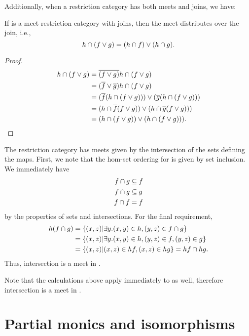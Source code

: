 Additionally, when a restriction category has both meets and joins, we have:
\begin{lemma}\label{lem:meet_distributes_over_join}
  If \R is a meet restriction category with joins, then the meet distributes over the join, i.e.,
  \[
    h\cap(f\vee g) = (h\cap f)\vee (h\cap g).
  \]
\end{lemma}
\begin{proof}
  \begin{align*}
    h\cap(f\vee g) &= \overline{(f\vee g)} h\cap (f\vee g)\\
    &= (\overline{f}\vee \overline{g}) h\cap (f\vee g)\\
    &= (\overline{f}(h\cap (f\vee g))) \vee (\overline{g}(h\cap (f\vee g)))\\
    &= (h\cap \overline{f}(f\vee g)) \vee (h\cap \overline{g}(f\vee g)))\\
    &= (h\cap (f\vee g)) \vee (h\cap (f\vee g))).
  \end{align*}
\end{proof}

\begin{example}\label{ex:pinj_has_meets}
The restriction category \pinj has meets given by the intersection of the sets defining the
maps. First, we note that the hom-set ordering for \pinj is given by set inclusion. We immediately have
\begin{align*}
  f\cap g &\subseteq f \\
  f\cap g &\subseteq g\\
  f\cap f & = f
\end{align*}
by the properties of sets and intersections. For the final requirement,
\begin{align*}
  h(f\cap g) &= \{(x,z) | \exists y. (x,y) \in h, (y,z) \in f\cap g\}\\
  &=   \{(x,z) | \exists y. (x,y)  \in h, (y,z) \in f, (y,z) \in g\}\\
  & = \{(x,z) | (x,z) \in h f, (x,z) \in h g\} = h f \cap h g.
\end{align*}
Thus, intersection is a meet in \pinj.

Note that the calculations above apply immediately to \Par as well, therefore intersection is a
meet in \Par.

\end{example}
\section{Partial monics and isomorphisms} %
\label{sub:restricted_monics_and_partial_isomorphisms}

